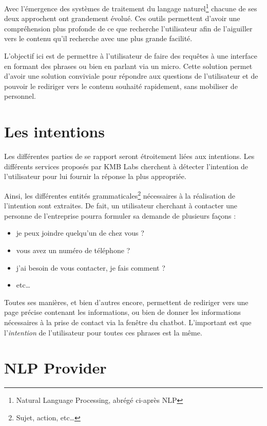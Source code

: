 \documentclass[12pt,a4paper,oneside]{scrreprt}
\begin{document}
Avec l'émergence des systèmes de traitement du langage naturel\footnote{Natural Language Processing, abrégé ci-après NLP} chacune de ses deux approchent ont grandement évolué. Ces outils permettent d'avoir une compréhension plus profonde de ce que recherche l'utilisateur afin de l'aiguiller vers le contenu qu'il recherche avec une plus grande facilité.

L'objectif ici est de permettre à l'utilisateur de faire des requêtes à une interface en formant des phrases ou bien en parlant via un micro. Cette solution permet d'avoir une solution conviviale pour répondre aux questions de l'utilisateur et de pouvoir le rediriger vers le contenu souhaité rapidement, sans mobiliser de personnel.

\section{Les intentions}

Les différentes parties de se rapport seront étroitement liées aux intentions. Les différents services proposés par KMB Labs cherchent à détecter l'intention de l'utilisateur pour lui fournir la réponse la plus appropriée.

Ainsi, les différentes entités grammaticales\footnote{Sujet, action, etc\dots} nécessaires à la réalisation de l'intention sont extraites. De fait, un utilisateur cherchant à contacter une personne de l'entreprise pourra formuler sa demande de plusieurs façons :
\begin{itemize}
	\item \og je peux joindre quelqu'un de chez vous ?\fg{}
	\item \og vous avez un numéro de téléphone ?\fg{}
	\item \og j'ai besoin de vous contacter, je fais comment ?\fg{}
	\item etc\dots
\end{itemize}

Toutes ses manières, et bien d'autres encore, permettent de rediriger vers une page précise contenant les informations, ou bien de donner les informations nécessaires à la prise de contact via la fenêtre du chatbot. L'important est que l'\textit{intention} de l'utilisateur pour toutes ces phrases est la même.

\section{NLP Provider}
\end{document}
